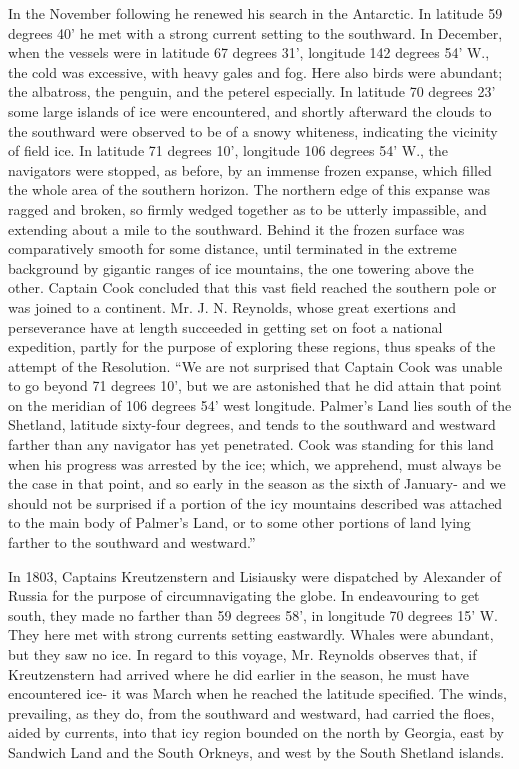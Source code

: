 In the November following he renewed his search in the Antarctic. In latitude
59 degrees 40' he met with a strong current setting to the southward. In
December, when the vessels were in latitude 67 degrees 31', longitude 142
degrees 54' W., the cold was excessive, with heavy gales and fog. Here also
birds were abundant; the albatross, the penguin, and the peterel especially. In
latitude 70 degrees 23' some large islands of ice were encountered, and shortly
afterward the clouds to the southward were observed to be of a snowy whiteness,
indicating the vicinity of field ice. In latitude 71 degrees 10', longitude 106
degrees 54' W., the navigators were stopped, as before, by an immense frozen
expanse, which filled the whole area of the southern horizon. The northern edge
of this expanse was ragged and broken, so firmly wedged together as to be
utterly impassible, and extending about a mile to the southward. Behind it the
frozen surface was comparatively smooth for some distance, until terminated in
the extreme background by gigantic ranges of ice mountains, the one towering
above the other. Captain Cook concluded that this vast field reached the
southern pole or was joined to a continent. Mr. J. N. Reynolds, whose great
exertions and perseverance have at length succeeded in getting set on foot a
national expedition, partly for the purpose of exploring these regions, thus
speaks of the attempt of the Resolution. ``We are not surprised that Captain Cook
was unable to go beyond 71 degrees 10', but we are astonished that he did attain
that point on the meridian of 106 degrees 54' west longitude. Palmer's Land lies
south of the Shetland, latitude sixty-four degrees, and tends to the southward
and westward farther than any navigator has yet penetrated. Cook was standing
for this land when his progress was arrested by the ice; which, we apprehend,
must always be the case in that point, and so early in the season as the sixth
of January- and we should not be surprised if a portion of the icy mountains
described was attached to the main body of Palmer's Land, or to some other
portions of land lying farther to the southward and westward.'' 

In 1803, Captains Kreutzenstern and Lisiausky were dispatched by Alexander of
Russia for the purpose of circumnavigating the globe. In endeavouring to get
south, they made no farther than 59 degrees 58', in longitude 70 degrees 15' W.
They here met with strong currents setting eastwardly. Whales were abundant, but
they saw no ice. In regard to this voyage, Mr. Reynolds observes that, if
Kreutzenstern had arrived where he did earlier in the season, he must have
encountered ice- it was March when he reached the latitude specified. The winds,
prevailing, as they do, from the southward and westward, had carried the floes,
aided by currents, into that icy region bounded on the north by Georgia, east by
Sandwich Land and the South Orkneys, and west by the South Shetland islands. 

